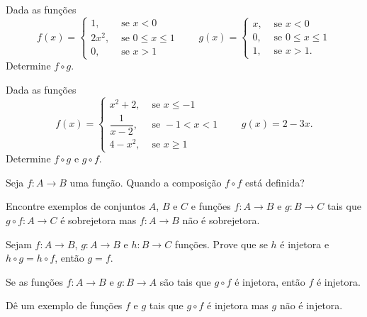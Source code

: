 \documentclass[12pt]{exam}
\begin{document}
    \questao{} Dada as funções
    \[
        f(x) = \begin{cases}
            1, & \mbox{ se } x < 0\\
            2x^2, & \mbox{ se } 0 \le x \le 1\\
            0, & \mbox{ se } x > 1
        \end{cases} \qquad g(x) = \begin{cases}
            x, & \mbox{ se } x < 0\\
            0, & \mbox{ se } 0 \le x \le 1\\
            1, & \mbox{ se } x > 1.
        \end{cases}
    \]
    Determine $f\circ g$.

    \vspace{.3cm}

    \questao{} Dada as funções
    \[
        f(x) = \begin{cases}
            x^2 + 2, & \mbox{ se } x \le -1\\
            \dfrac{1}{x - 2}, & \mbox{ se } -1 < x < 1\\
            4 - x^2, & \mbox{ se } x \ge 1
        \end{cases} \qquad g(x) = 2 - 3x.
    \]
    Determine $f\circ g$ e $g \circ f$.

    \vspace{.3cm}

    \questao{} Seja $f : A \to B$ uma função. Quando a composição $f \circ f$ está definida?

    \vspace{.3cm}

    \questao{} Encontre exemplos de conjuntos $A$, $B$ e $C$ e funções $f : A \to B$ e $g : B \to C$ tais que $g \circ f : A \to C$ é sobrejetora mas $f : A \to B$ não é sobrejetora.

    \vspace{.3cm}

    \questao{} Sejam $f : A \to B$, $g : A \to B$ e $h : B \to C$ funções. Prove que se $h$ é injetora e $h \circ g = h \circ f$, então $g = f$.

    \vspace{.3cm}

    \questao{} Se as funç{õ}es $f : A \to B$ e $g : B\to A$ são
    tais que $g\circ f$ é injetora, então $f$ é injetora.

    \vspace{.3cm}

    \questao{} Dê um exemplo de funções $f$ e $g$ tais que $g \circ f$ é injetora mas $g$ não é injetora.
\end{document}
